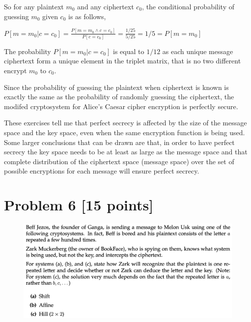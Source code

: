 \documentclass{ashoka-crypto}
\begin{document}
So for any plaintext $m_0$ and any ciphertext $c_0$, the conditional probability of guessing $m_0$ given $c_0$ is as follows,

\begin{math}
P[m = m_0 | c = c_0] = \frac{P[m = m_0 \land c = c_0]}{P[c = c_0]} = \frac{1/25}{5/25} = 1/5 = P[m = m_0]
\end{math}

The probability $P[m = m_0 | c = c_0]$ is equal to $1/12$ as each unique message ciphertext form a unique element in the triplet matrix, that is no two different encrypt $m_0$ to $c_0$.

Since the probability of guessing the plaintext when ciphertext is known is exactly the same as the probability of randomly guessing the ciphertext, the modifed cryptosystem for Alice's Caesar cipher encryption is perfectly secure.

These exercises tell me that perfect secrecy is affected by the size of the message space and the key space, even when the same encryption function is being used. Some larger conclusions that can be drawn are that, in order to have perfect secrecy the key space needs to be at least as large as the message space and that complete distribution of the ciphertext space (message space) over the set of possible encryptions for each message will ensure perfect secrecy.

\clearpage

\section*{Problem 6 [15 points]}

\begin{figure}[h]
\includegraphics[width=17cm]{6}
\end{figure}
\end{document}
